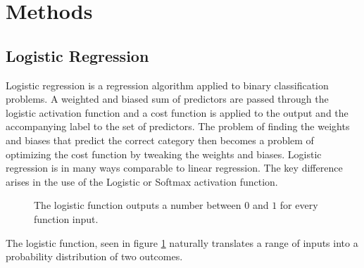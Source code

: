 \documentclass[11pt,a4paper,titlepage]{article}
\begin{document}
\section{Methods}
\subsection{Logistic Regression}
Logistic regression is a regression algorithm applied to binary classification problems. A weighted and biased sum of predictors are passed through the logistic activation function and a cost function is applied to the output and the accompanying label to the set of predictors. The problem of finding the weights and biases that predict the correct category then becomes a problem of optimizing the cost function by tweaking the weights and biases. Logistic regression is in many ways comparable to linear regression. The key difference arises in the use of the Logistic or Softmax activation function.
\begin{figure}[H]
\begin{center}
\end{center}
\caption[Logistic function]{The logistic function outputs a number between $0$ and $1$ for every function input.}
\label{logisticfunc}
\end{figure}
The logistic function, seen in figure \ref{logisticfunc} naturally translates a range of inputs into a probability distribution of two outcomes.
\end{document}
